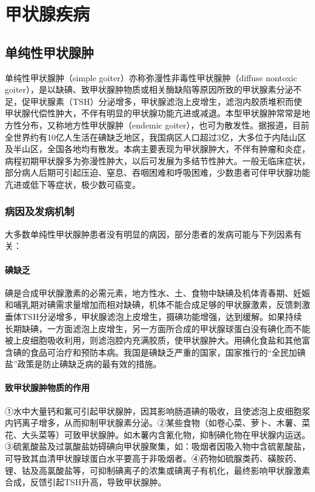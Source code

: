 \section{甲状腺疾病}

\subsection{单纯性甲状腺肿}

单纯性甲状腺肿（simple goiter）亦称弥漫性非毒性甲状腺肿（diffuse
nontoxic
goiter），是以缺碘、致甲状腺肿物质或相关酶缺陷等原因所致的甲状腺素分泌不足，促甲状腺素（TSH）分泌增多，甲状腺滤泡上皮增生，滤泡内胶质堆积而使甲状腺代偿性肿大，不伴有明显的甲状腺功能亢进或减退。本型甲状腺肿常常是地方性分布，又称地方性甲状腺肿（endemic
goiter），也可为散发性。据报道，目前全世界约有10亿人生活在碘缺乏地区，我国病区人口超过3亿，大多位于内陆山区及半山区，全国各地均有散发。本病主要表现为甲状腺肿大，不伴有肿瘤和炎症，病程初期甲状腺多为弥漫性肿大，以后可发展为多结节性肿大。一般无临床症状，部分病人后期可引起压迫、窒息、吞咽困难和呼吸困难，少数患者可伴甲状腺功能亢进或低下等症状，极少数可癌变。

\subsubsection{病因及发病机制}

大多数单纯性甲状腺肿患者没有明显的病因，部分患者的发病可能与下列因素有关：

\paragraph{碘缺乏}
碘是合成甲状腺激素的必需元素，地方性水、土、食物中缺碘及机体青春期、妊娠和哺乳期对碘需求量增加而相对缺碘，机体不能合成足够的甲状腺激素，反馈刺激垂体TSH分泌增多，甲状腺滤泡上皮增生，摄碘功能增强，达到缓解。如果持续长期缺碘，一方面滤泡上皮增生，另一方面所合成的甲状腺球蛋白没有碘化而不能被上皮细胞吸收利用，则滤泡腔内充满胶质，使甲状腺肿大。用碘化食盐和其他富含碘的食品可治疗和预防本病。我国是碘缺乏严重的国家，国家推行的“全民加碘盐”政策是防止碘缺乏病的最有效的措施。

\paragraph{致甲状腺肿物质的作用}
①水中大量钙和氟可引起甲状腺肿，因其影响肠道碘的吸收，且使滤泡上皮细胞浆内钙离子增多，从而抑制甲状腺素分泌。②某些食物（如卷心菜、萝卜、木薯、菜花、大头菜等）可致甲状腺肿。如木薯内含氰化物，抑制碘化物在甲状腺内运送。③硫氰酸盐及过氯酸盐妨碍碘向甲状腺聚集，如：吸烟者因吸入物中含硫氰酸盐，可导致其血清甲状腺球蛋白水平要高于非吸烟者。④药物如硫脲类药、磺胺药、锂、钴及高氯酸盐等，可抑制碘离子的浓集或碘离子有机化，最终影响甲状腺激素合成，反馈引起TSH升高，导致甲状腺肿。

